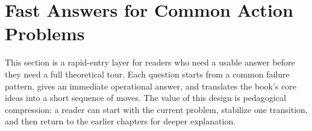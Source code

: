 \section{Fast Answers for Common Action Problems}

This section is a rapid-entry layer for readers who need a usable answer before
they need a full theoretical tour. Each question starts from a common failure
pattern, gives an immediate operational answer, and translates the book's core
ideas into a short sequence of moves. The value of this design is pedagogical
compression: a reader can start with the current problem, stabilize one
transition, and then return to the earlier chapters for deeper explanation.








